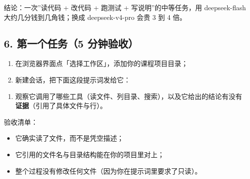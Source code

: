 \begin{Shaded}
\begin{Highlighting}[]
\end{Highlighting}
\end{Shaded}

结论：一次''读代码 + 改代码 + 跑测试 + 写说明''的中等任务，用
deepseek-flash 大约几分钱到几角钱；换成 deepseek-v4-pro 会贵 3 到 4 倍。

\subsection{6. 第一个任务（5
分钟验收）}\label{ux7b2cux4e00ux4e2aux4efbux52a15-ux5206ux949fux9a8cux6536}

\begin{enumerate}
\def\labelenumi{\arabic{enumi}.}
\tightlist
\item
  在浏览器界面点「选择工作区」，添加你的课程项目目录；
\item
  新建会话，把下面这段提示词发给它：
\end{enumerate}

\begin{Shaded}
\begin{Highlighting}[]
\end{Highlighting}
\end{Shaded}

\begin{enumerate}
\def\labelenumi{\arabic{enumi}.}
\setcounter{enumi}{2}
\tightlist
\item
  观察它调用了哪些工具（读文件、列目录、搜索），以及它给出的结论有没有\textbf{证据}（引用了具体文件与行）。
\end{enumerate}

验收清单：

\begin{itemize}
\tightlist
\item
  它确实读了文件，而不是凭空描述；
\item
  它引用的文件名与目录结构能在你的项目里对上；
\item
  整个过程没有修改任何文件（因为你在提示词里要求了只读）。
\end{itemize}

